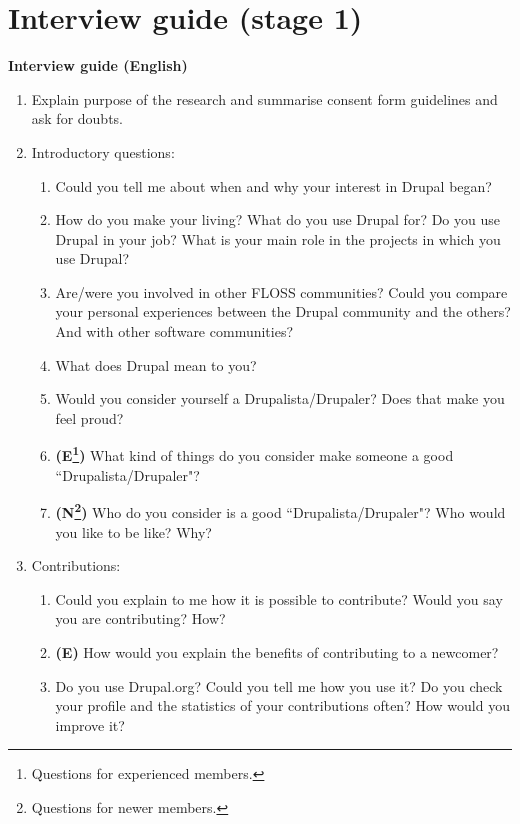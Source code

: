 \chapter{Interview guide (stage 1)}
\label{appendix-interview-guide}

\newpage
	
\hrulefill\par

\begin{center}
\textbf{Interview guide (English)}
\end{center}

\begin{enumerate}
	\item Explain purpose of the research and summarise consent form guidelines and ask for doubts.
	\item Introductory questions:
		\begin{enumerate}
			\item Could you tell me about when and why your interest in Drupal began?
			\item How do you make your living? What do you use Drupal for? Do you use Drupal in your job? What is your main role in the projects in which you use Drupal?
			\item Are\slash were you involved in other FLOSS communities? Could you compare your personal experiences between the Drupal community and the others? And with other software communities?
			\item What does Drupal mean to you?
			\item Would you consider yourself a Drupalista\slash Drupaler? Does that make you feel proud?
			\item \textbf{(E\footnote{Questions for experienced members.})} What kind of things do you consider make someone a good ``Drupalista\slash Drupaler"?
			\item \textbf{(N\footnote{Questions for newer members.})} Who do you consider is a good ``Drupalista\slash Drupaler"? Who would you like to be like? Why?
		\end{enumerate}
	\item Contributions:
		\begin{enumerate}
			\item Could you explain to me how it is possible to contribute?  Would you say you are contributing? How?
			\item \textbf{(E)} How would you explain the benefits of contributing to a newcomer?
			\item Do you use Drupal.org? Could you tell me how you use it? Do you check your profile and the statistics of your contributions often? How would you improve it?

\end{enumerate}
\end{enumerate}
